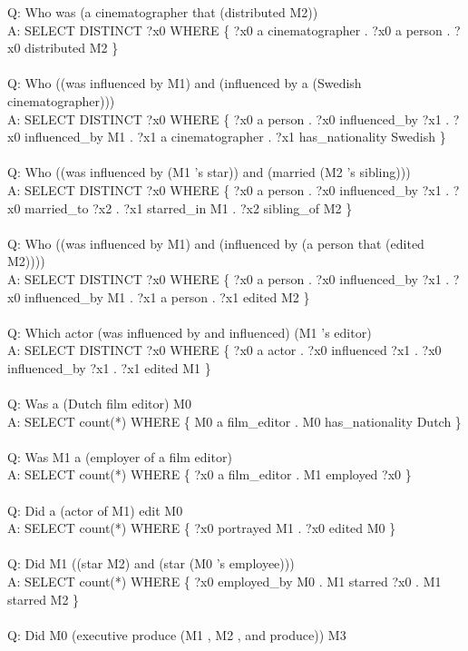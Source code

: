 \documentclass{article} \usepackage{iclr2022_conference,times}
\begin{document}
{Q: Who was (a cinematographer that (distributed M2)) \\
A: SELECT DISTINCT ?x0 WHERE \{ ?x0 a cinematographer . ?x0 a person . ?x0 distributed M2 \} \\
 \\
Q: Who ((was influenced by M1) and (influenced by a (Swedish cinematographer))) \\
A: SELECT DISTINCT ?x0 WHERE \{ ?x0 a person . ?x0 influenced\_by ?x1 . ?x0 influenced\_by M1 . ?x1 a cinematographer . ?x1 has\_nationality Swedish \} \\
 \\
Q: Who ((was influenced by (M1 's star)) and (married (M2 's sibling))) \\
A: SELECT DISTINCT ?x0 WHERE \{ ?x0 a person . ?x0 influenced\_by ?x1 . ?x0 married\_to ?x2 . ?x1 starred\_in M1 . ?x2 sibling\_of M2 \} \\
 \\
Q: Who ((was influenced by M1) and (influenced by (a person that (edited M2)))) \\
A: SELECT DISTINCT ?x0 WHERE \{ ?x0 a person . ?x0 influenced\_by ?x1 . ?x0 influenced\_by M1 . ?x1 a person . ?x1 edited M2 \} \\
 \\
Q: Which actor (was influenced by and influenced) (M1 's editor) \\
A: SELECT DISTINCT ?x0 WHERE \{ ?x0 a actor . ?x0 influenced ?x1 . ?x0 influenced\_by ?x1 . ?x1 edited M1 \} \\
 \\
Q: Was a (Dutch film editor) M0 \\
A: SELECT count(*) WHERE \{ M0 a film\_editor . M0 has\_nationality Dutch \} \\
 \\
Q: Was M1 a (employer of a film editor) \\
A: SELECT count(*) WHERE \{ ?x0 a film\_editor . M1 employed ?x0 \} \\
 \\
Q: Did a (actor of M1) edit M0 \\
A: SELECT count(*) WHERE \{ ?x0 portrayed M1 . ?x0 edited M0 \} \\
 \\
Q: Did M1 ((star M2) and (star (M0 's employee))) \\
A: SELECT count(*) WHERE \{ ?x0 employed\_by M0 . M1 starred ?x0 . M1 starred M2 \} \\
 \\
Q: Did M0 (executive produce (M1 , M2 , and produce)) M3 \\
}
\end{document}
